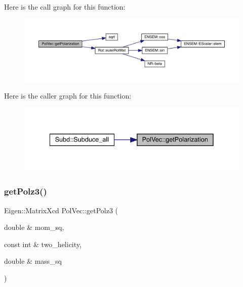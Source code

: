 Here is the call graph for this function\+:
\nopagebreak
\begin{figure}[H]
\begin{center}
\leavevmode
\includegraphics[width=350pt]{d7/d0c/namespacePolVec_a068ffc885b3c06caa2c662b8887c0891_cgraph}
\end{center}
\end{figure}
Here is the caller graph for this function\+:
\nopagebreak
\begin{figure}[H]
\begin{center}
\leavevmode
\includegraphics[width=335pt]{d7/d0c/namespacePolVec_a068ffc885b3c06caa2c662b8887c0891_icgraph}
\end{center}
\end{figure}
\mbox{\label{namespacePolVec_a8671b890f81a976ae4f806cf53ae61df}} 
\subsubsection{\texorpdfstring{getPolz3()}{getPolz3()}}
{\footnotesize\ttfamily Eigen\+::\+Matrix\+Xcd Pol\+Vec\+::get\+Polz3 (\begin{DoxyParamCaption}\item[{double \&}]{mom\+\_\+sq,  }\item[{const int \&}]{two\+\_\+helicity,  }\item[{double \&}]{mass\+\_\+sq }\end{DoxyParamCaption})}

